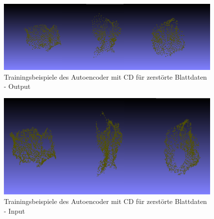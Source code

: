 \documentclass{llncs}
\begin{document}
\begin{figure}[htbp] 
	\centering
	\includegraphics[width=1.0\textwidth]{autoencoder_destroyed_example_chamfer_fake.png}
	\caption{Trainingsbeispiele des Autoencoder mit CD für zerstörte Blattdaten - Output}
	\label{fig:Bild68}
\end{figure}

\begin{figure}[htbp] 
	\centering
	\includegraphics[width=1.0\textwidth]{autoencoder_destroyed_example_chamfer_real.png}
	\caption{Trainingsbeispiele des Autoencoder mit CD für zerstörte Blattdaten - Input}
	\label{fig:Bild69}
\end{figure}
\newpage
\end{document}

